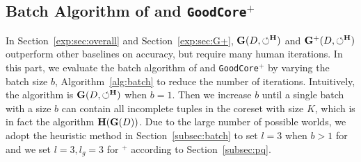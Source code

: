 
\subsection{Batch Algorithm of \ours and \texttt{GoodCore}$^+$}
\label{exp:sec:batchalgo}

In Section~\ref{exp:sec:overall} and Section~\ref{exp:sec:G+}, $\mathbf{G}(D,\circlearrowleft^\mathbf{H})$ and $\mathbf{G}^+(D,\circlearrowleft^\mathbf{H})$ outperform other baselines on accuracy, but require many human iterations. In this part, we evaluate  the batch algorithm of \ours and \texttt{GoodCore}$^+$ by varying the batch size $b$, \ie Algorithm~\ref{alg:batch} to reduce the number of iterations. Intuitively, the algorithm is  $\mathbf{G}(D,\circlearrowleft^\mathbf{H})$  when $b=1$. 
Then we increase $b$ until a single batch with a size $b$ can contain all incomplete tuples in the coreset with size $K$, which is in fact the algorithm $\mathbf{H}(\mathbf{G}(D))$.
 Due to the large number of possible worlds, we adopt the heuristic method in Section~\ref{subsec:batch} to set $l=3$ when $b>1$ for \ours and we set $l=3,  l_g=3$ for \ours$^+$ according to Section~\ref{subsec:pq}. 

